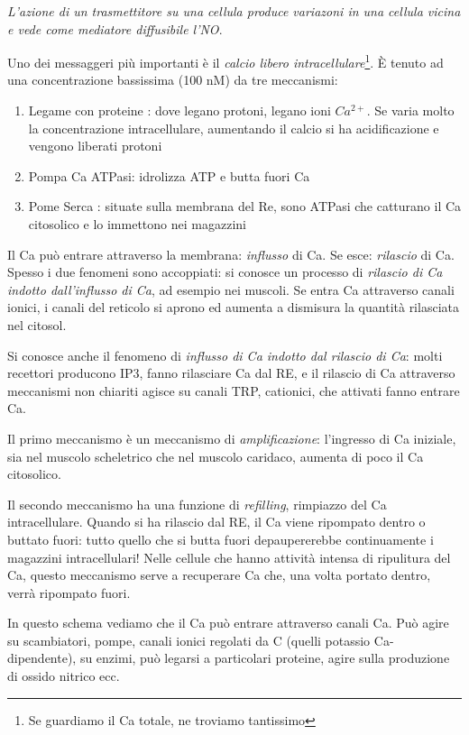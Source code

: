 \documentclass[a4paper,12pt]{article}
\begin{document}
\emph{L'azione di un trasmettitore su una cellula produce variazoni in una cellula vicina e vede come mediatore diffusibile l'NO}.

Uno dei messaggeri più importanti è il \emph{calcio libero intracellulare}\footnote{Se guardiamo il Ca totale, ne troviamo tantissimo}. È tenuto ad una concentrazione bassissima (100 nM) da tre meccanismi:
\begin{enumerate}
\item{Legame con proteine : dove legano protoni, legano ioni $Ca^{2+}$. Se varia molto la concentrazione intracellulare, aumentando il calcio si ha acidificazione e vengono liberati protoni}
\item{Pompa Ca ATPasi: idrolizza ATP e butta fuori Ca}
\item{Pome Serca : situate sulla membrana del Re, sono ATPasi che catturano il Ca citosolico e lo immettono nei magazzini}
\end{enumerate}


Il Ca può entrare attraverso la membrana: \emph{influsso} di Ca. Se esce: \emph{rilascio} di Ca. Spesso i due fenomeni sono accoppiati: si conosce un processo di \emph{rilascio di Ca indotto dall'influsso di Ca}, ad esempio nei muscoli. Se entra Ca attraverso canali ionici, i canali del reticolo si aprono ed aumenta a dismisura la quantità rilasciata nel citosol.

Si conosce anche il fenomeno di \emph{influsso di Ca indotto dal rilascio di Ca}: molti recettori producono IP3, fanno rilasciare Ca dal RE, e il rilascio di Ca attraverso meccanismi non chiariti agisce su canali TRP, cationici, che attivati fanno entrare Ca. 

Il primo meccanismo è un meccanismo di \emph{amplificazione}: l'ingresso di Ca iniziale, sia nel muscolo scheletrico che nel muscolo caridaco, aumenta di poco il Ca citosolico.

Il secondo meccanismo ha una funzione di \emph{refilling}, rimpiazzo del Ca intracellulare. Quando si ha rilascio dal RE, il Ca viene ripompato dentro o buttato fuori: tutto quello che si butta fuori depaupererebbe continuamente i magazzini intracellulari! Nelle cellule che hanno attività intensa di ripulitura del Ca, questo meccanismo serve a recuperare Ca che, una volta portato dentro, verrà ripompato fuori.

In questo schema vediamo che il Ca può entrare attraverso canali Ca. Può agire su scambiatori, pompe, canali ionici regolati da C (quelli potassio Ca-dipendente), su enzimi, può legarsi a particolari proteine, agire sulla produzione di ossido nitrico ecc.
\end{document}

